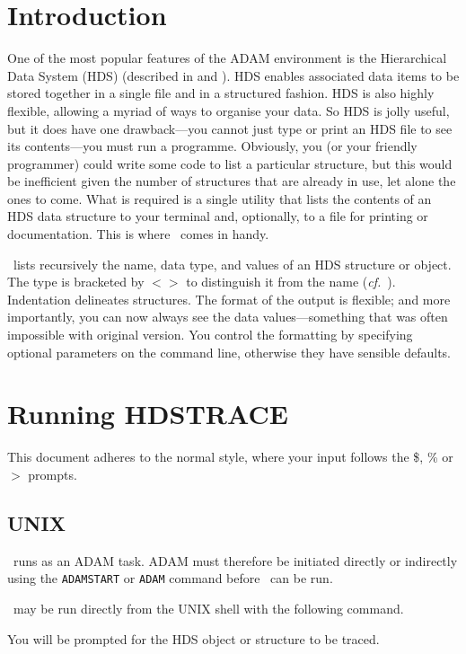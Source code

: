 \documentclass[11pt,nolof]{starlink}
\begin{document}
\scfrontmatter

\section{Introduction} One of the most popular features of the ADAM
environment is the Hierarchical Data System (HDS) (described in
 and ).  HDS enables associated data
items to be stored together in a single file and in a structured fashion.
HDS is also highly flexible, allowing a myriad of ways to organise your data.
So HDS is jolly useful, but it does have one drawback---you cannot just type
or print an HDS file to see its contents---you must run a programme.
Obviously, you (or your friendly programmer) could write some code to
list a particular structure, but this would be inefficient given the
number of structures that are already in use, let alone the ones to
come.  What is required is a single utility that lists the contents of
an HDS data structure to your terminal and, optionally, to a file for
printing or documentation. This is where \HDSTRACE\ comes in handy.

\HDSTRACE\ lists recursively the name, data type, and
values of an HDS structure or object.  The type is bracketed by $<>$ to
distinguish it from the name (\emph{cf.}\ ).  Indentation
delineates structures.  The format of the output is flexible; and more
importantly, you can now always see the data values---something that was
often impossible with original version.  You control the formatting by
specifying optional parameters on the command line, otherwise they have
sensible defaults.


\section{Running HDSTRACE}
This document adheres to the normal style, where your input follows
the \$, \% or $>$ prompts.

\subsection{UNIX}
\HDSTRACE\ runs as an \textsc{ADAM} task.  \textsc{ADAM} must
therefore be initiated directly or indirectly using the \texttt{ADAMSTART}
or \texttt{ADAM} command before \HDSTRACE\ can be run.

\HDSTRACE\ may be run directly from the UNIX shell with the
following command.
\small
\begin{terminalv}
\end{terminalv}
\normalsize
You will be prompted for the HDS object or structure to be traced.
\end{document}
